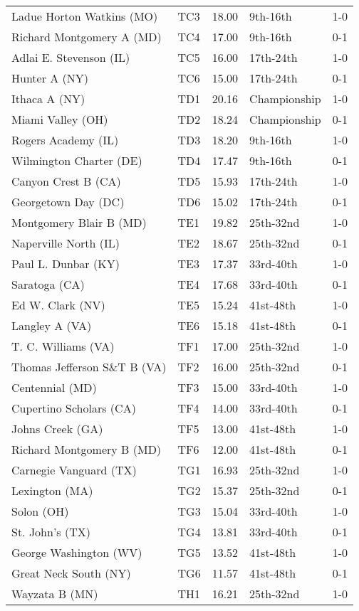 \documentclass{article}%
\begin{document}
\begin{longtable}{|llllc|}
Ladue Horton Watkins (MO)&TC3&18.00&9th{-}16th&1{-}0\\%
Richard Montgomery A (MD)&TC4&17.00&9th{-}16th&0{-}1\\%
Adlai E. Stevenson (IL)&TC5&16.00&17th{-}24th&1{-}0\\%
Hunter A (NY)&TC6&15.00&17th{-}24th&0{-}1\\%
Ithaca A (NY)&TD1&20.16&Championship&1{-}0\\%
Miami Valley (OH)&TD2&18.24&Championship&0{-}1\\%
Rogers Academy (IL)&TD3&18.20&9th{-}16th&1{-}0\\%
Wilmington Charter (DE)&TD4&17.47&9th{-}16th&0{-}1\\%
Canyon Crest B (CA)&TD5&15.93&17th{-}24th&1{-}0\\%
Georgetown Day (DC)&TD6&15.02&17th{-}24th&0{-}1\\%
Montgomery Blair B (MD)&TE1&19.82&25th{-}32nd&1{-}0\\%
Naperville North (IL)&TE2&18.67&25th{-}32nd&0{-}1\\%
Paul L. Dunbar (KY)&TE3&17.37&33rd{-}40th&1{-}0\\%
Saratoga (CA)&TE4&17.68&33rd{-}40th&0{-}1\\%
Ed W. Clark (NV)&TE5&15.24&41st{-}48th&1{-}0\\%
Langley A (VA)&TE6&15.18&41st{-}48th&0{-}1\\%
T. C. Williams (VA)&TF1&17.00&25th{-}32nd&1{-}0\\%
Thomas Jefferson S\&T B (VA)&TF2&16.00&25th{-}32nd&0{-}1\\%
Centennial (MD)&TF3&15.00&33rd{-}40th&1{-}0\\%
Cupertino Scholars (CA)&TF4&14.00&33rd{-}40th&0{-}1\\%
Johns Creek (GA)&TF5&13.00&41st{-}48th&1{-}0\\%
Richard Montgomery B (MD)&TF6&12.00&41st{-}48th&0{-}1\\%
Carnegie Vanguard (TX)&TG1&16.93&25th{-}32nd&1{-}0\\%
Lexington (MA)&TG2&15.37&25th{-}32nd&0{-}1\\%
Solon (OH)&TG3&15.04&33rd{-}40th&1{-}0\\%
St. John's (TX)&TG4&13.81&33rd{-}40th&0{-}1\\%
George Washington (WV)&TG5&13.52&41st{-}48th&1{-}0\\%
Great Neck South (NY)&TG6&11.57&41st{-}48th&0{-}1\\%
Wayzata B (MN)&TH1&16.21&25th{-}32nd&1{-}0\\%

\end{longtable}
\end{document}
